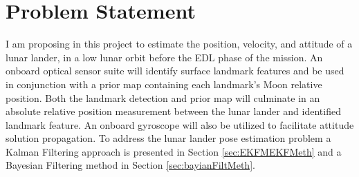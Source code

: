 \documentclass[conf]{new-aiaa}
\begin{document}

\section{Problem Statement}

I am proposing in this project to estimate the position, velocity, and attitude of a lunar lander, in a low lunar orbit before the EDL phase of the mission. An onboard optical sensor suite will identify surface landmark features and be used in conjunction with a prior map containing each landmark's Moon relative position. Both the landmark detection and prior map will culminate in an absolute relative position measurement between the lunar lander and identified landmark feature. An onboard gyroscope will also be utilized to facilitate attitude solution propagation. To address the lunar lander pose estimation problem a Kalman Filtering approach is presented in Section \ref{sec:EKFMEKFMeth} and a Bayesian Filtering method in Section \ref{sec:bayianFiltMeth}.
\end{document}
